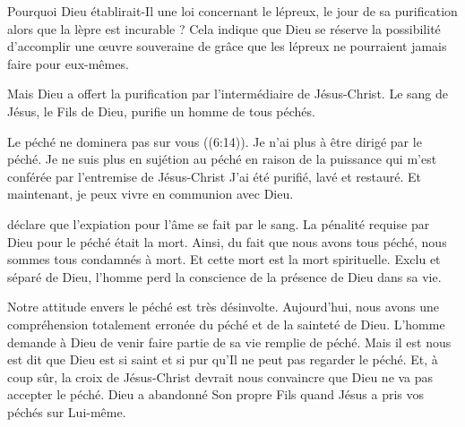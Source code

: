 Pourquoi Dieu établirait-Il une loi concernant le lépreux,
 le jour de sa purification alors que la lèpre est incurable ?
 Cela indique que Dieu se réserve la possibilité d'accomplir
 une œuvre souveraine de grâce que les lépreux ne pourraient
 jamais faire pour eux-mêmes. 


Mais Dieu a offert la purification par l'intermédiaire de Jésus-Christ.
 Le sang de Jésus, le Fils de Dieu, purifie un homme de tous péchés. 

\og Le péché ne dominera pas sur vous \fg{} ((6:14)).
 Je n'ai plus à être dirigé par le péché.
 Je ne suis plus en sujétion 
 au péché en raison de la puissance
 qui m'est conférée par l'entremise de Jésus-Christ
 \ocadr{}J'ai été purifié, lavé et restauré.
 Et maintenant, je peux vivre en communion avec Dieu. 

\dvrule






 déclare que l'expiation
 pour l'âme se fait par le sang.
 La pénalité requise par Dieu pour le péché était la mort.
 Ainsi, du fait que nous avons tous péché,
 nous sommes tous condamnés à mort.
 Et cette mort est la mort spirituelle. Exclu et séparé de Dieu,
 l'homme perd la conscience de la présence de Dieu dans sa vie. 

Notre attitude envers le péché est très désinvolte.
 Aujourd'hui, nous avons une compréhension totalement erronée du péché
 et de la sainteté de Dieu.
 L'homme demande à Dieu de venir faire partie de sa vie remplie de péché.
 Mais il est nous est dit que Dieu est si saint et si pur
 qu'Il ne peut pas regarder le péché.
 Et, à coup sûr, la croix de Jésus-Christ devrait nous convaincre
 que Dieu ne va pas accepter le péché.
 Dieu a abandonné Son propre Fils quand Jésus a pris vos péchés
 sur Lui-même.

